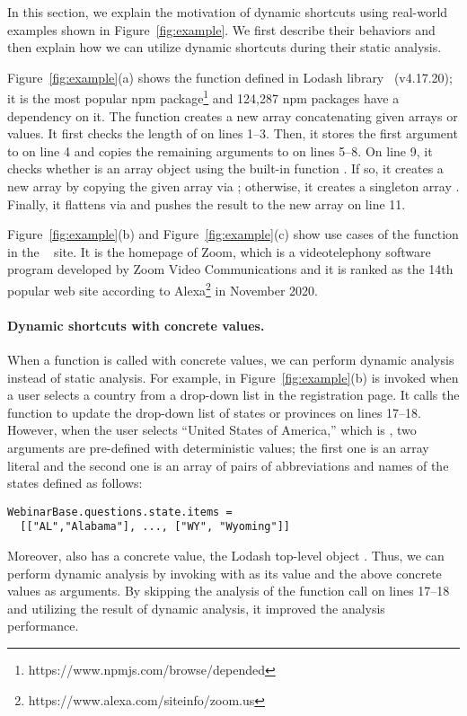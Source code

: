 In this section, we explain the motivation of dynamic shortcuts
using real-world examples shown in Figure~\ref{fig:example}.
We first describe their behaviors and then explain how we can utilize
dynamic shortcuts during their static analysis.

Figure~\ref{fig:example}(a) shows the  function defined
in Lodash library~\cite{lodash} (v4.17.20); it is
the most popular npm package\footnote{https://www.npmjs.com/browse/depended}
and 124,287 npm packages have a dependency on it.
The  function creates a new array concatenating given arrays or values.
It first checks the length of  on lines 1--3.
Then, it stores the first argument to  on line 4 and
copies the remaining arguments to  on lines 5--8.
On line 9, it checks whether  is an array object using
the built-in function .  If so, it creates a new array
by copying the given array via ; otherwise,
it creates a singleton array \jscode{[array]}.  Finally, it flattens
 via  and pushes the result to the
new array on line 11.

Figure~\ref{fig:example}(b) and Figure~\ref{fig:example}(c) show use
cases of the  function in the ~\cite{zoom} site.
It is the homepage of Zoom, which is a videotelephony software program developed by Zoom
Video Communications and it is ranked as the 14th popular web site according
to Alexa\footnote{https://www.alexa.com/siteinfo/zoom.us} in November 2020.

\paragraph{Dynamic shortcuts with concrete values.}
When a function is called with concrete values, we can perform
dynamic analysis instead of static analysis.
For example,  in Figure~\ref{fig:example}(b)
is invoked when a user selects a country from a drop-down list in the registration page.
It calls the  function to update the drop-down list of
states or provinces on lines 17--18.  However, when the user selects ``United States of America,''
which is , two arguments are pre-defined with
deterministic values; the first one is an array literal
 and the second one is an array of pairs
of abbreviations and names of the states defined as follows:
\begin{lstlisting}[style=myJSstyle,numbers=none]
WebinarBase.questions.state.items =
  [["AL","Alabama"], ..., ["WY", "Wyoming"]]
\end{lstlisting}
Moreover,  also has a concrete value, the Lodash top-level object \jscode{\_}.
Thus, we can perform dynamic analysis by invoking  with
\jscode{\_} as its  value and the above concrete values as arguments. 
By skipping the analysis of the function call on lines 17--18 and
utilizing the result of dynamic analysis, it improved the analysis performance.

